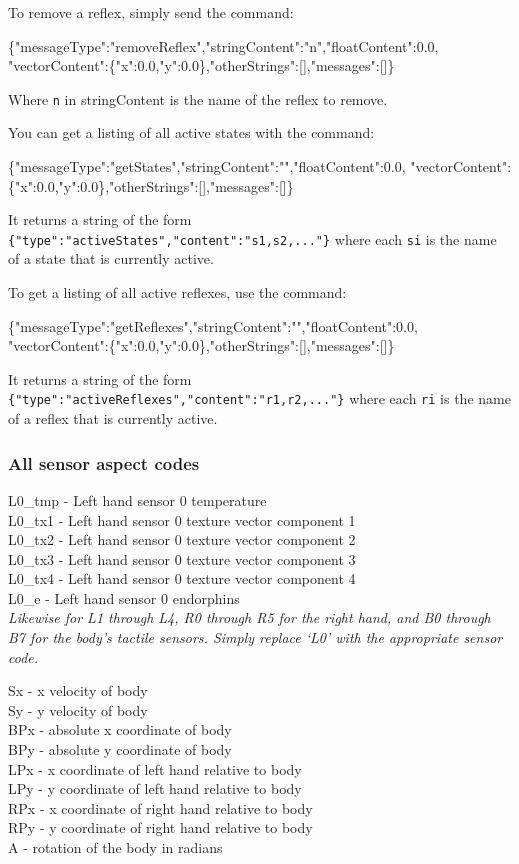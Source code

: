 To remove a reflex, simply send the command:
\begin{center}
	\scriptsize{\{"messageType":"removeReflex","stringContent":"n","floatContent":0.0, "vectorContent":\{"x":0.0,"y":0.0\},"otherStrings":[],"messages":[]\}}
\end{center}
Where \texttt{n} in stringContent is the name of the reflex to remove.

You can get a listing of all active states with the command:
\begin{center}
	\scriptsize{\{"messageType":"getStates","stringContent":"","floatContent":0.0, "vectorContent":\{"x":0.0,"y":0.0\},"otherStrings":[],"messages":[]\}}
\end{center}
 It returns a string of the form \texttt{\{"type":"activeStates","content":"s1,s2,..."\}} where each \texttt{si} is the name of a state that is currently active. 

To get a listing of all active reflexes, use the command:
\begin{center}
	\scriptsize{\{"messageType":"getReflexes","stringContent":"","floatContent":0.0, "vectorContent":\{"x":0.0,"y":0.0\},"otherStrings":[],"messages":[]\}}
\end{center}
It returns a string of the form \texttt{\{"type":"activeReflexes","content":"r1,r2,..."\}} where each \texttt{ri} is the name of a reflex that is currently active.

\subsubsection{All sensor aspect codes}
\label{sect:sensorAspectCodes}

L0\_tmp - Left hand sensor 0 temperature\\
L0\_tx1 - Left hand sensor 0 texture vector component 1\\
L0\_tx2 - Left hand sensor 0 texture vector component 2\\
L0\_tx3 - Left hand sensor 0 texture vector component 3\\
L0\_tx4 - Left hand sensor 0 texture vector component 4\\
L0\_e - Left hand sensor 0 endorphins\\
\textit{Likewise for L1 through L4, R0 through R5 for the right hand, and B0 through B7 for the body's tactile sensors. Simply replace `L0' with the appropriate sensor code.}

\noindent Sx - x velocity of body\\
Sy - y velocity of body\\
BPx - absolute x coordinate of body\\
BPy - absolute y coordinate of body\\
LPx - x coordinate of left hand relative to body\\
LPy - y coordinate of left hand relative to body\\
RPx - x coordinate of right hand relative to body\\
RPy - y coordinate of right hand relative to body\\
A - rotation of the body in radians

